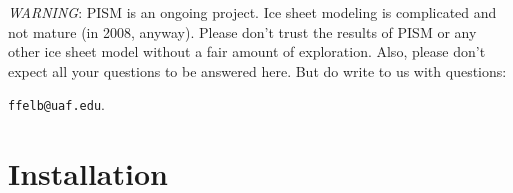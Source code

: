 \documentclass[11pt,final]{amsart}
\begin{document}
\vspace{1.5in}
\large
\begin{center}
 \emph{WARNING}:  PISM is an ongoing project.  Ice sheet modeling is complicated and not mature (in 2008, anyway).  Please don't trust the results of PISM or any other ice sheet model without a fair amount of exploration.  Also, please don't expect all your questions to be answered here.  But do write to us with questions: 

\verb|ffelb@uaf.edu|.
\end{center}
\normalsize

\newpage
\section{Installation}\label{sect:install}
\end{document}
